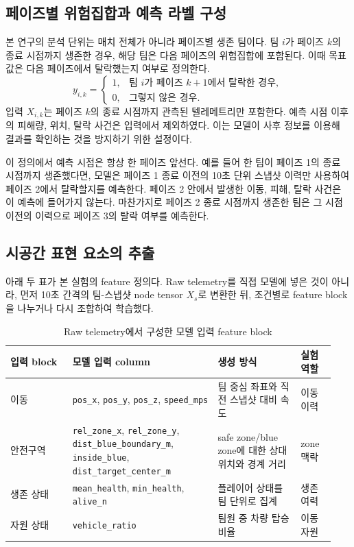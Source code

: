 \subsection{페이즈별 위험집합과 예측 라벨 구성}

본 연구의 분석 단위는 매치 전체가 아니라 페이즈별 생존 팀이다. 팀 \(i\)가
페이즈 \(k\)의 종료 시점까지 생존한 경우, 해당 팀은 다음 페이즈의 위험집합에
포함된다. 이때 목표값은 다음 페이즈에서 탈락했는지 여부로 정의한다.
\[
y_{i,k} =
\begin{cases}
1, & \text{팀 } i \text{가 페이즈 } k+1 \text{에서 탈락한 경우},\\
0, & \text{그렇지 않은 경우}.
\end{cases}
\]
입력 \(X_{i,k}\)는 페이즈 \(k\)의 종료 시점까지 관측된 텔레메트리만 포함한다.
예측 시점 이후의 피해량, 위치, 탈락 사건은 입력에서 제외하였다. 이는 모델이 사후
정보를 이용해 결과를 확인하는 것을 방지하기 위한 설정이다.

이 정의에서 예측 시점은 항상 한 페이즈 앞선다. 예를 들어 한 팀이 페이즈 1의
종료 시점까지 생존했다면, 모델은 페이즈 1 종료 이전의 10초 단위 스냅샷 이력만
사용하여 페이즈 2에서 탈락할지를 예측한다. 페이즈 2 안에서 발생한 이동, 피해,
탈락 사건은 이 예측에 들어가지 않는다. 마찬가지로 페이즈 2 종료 시점까지 생존한
팀은 그 시점 이전의 이력으로 페이즈 3의 탈락 여부를 예측한다.

\subsection{시공간 표현 요소의 추출}

아래 두 표가 본 실험의 feature 정의다. Raw telemetry를 직접 모델에 넣은 것이 아니라,
먼저 10초 간격의 팀-스냅샷 node tensor \(X_s\)로 변환한 뒤, 조건별로 feature block을
나누거나 다시 조합하여 학습했다.

\begin{table}[t]
\centering
\caption{Raw telemetry에서 구성한 모델 입력 feature block}
\label{tab:raw-feature-blocks}
\scriptsize
\setlength{\tabcolsep}{3pt}
\begin{tabular}{L{0.18\linewidth}L{0.42\linewidth}L{0.24\linewidth}L{0.10\linewidth}}
\toprule
입력 block & 모델 입력 column & 생성 방식 & 실험 역할 \\
\midrule
이동
& \texttt{pos\_x}, \texttt{pos\_y}, \texttt{pos\_z}, \texttt{speed\_mps}
& 팀 중심 좌표와 직전 스냅샷 대비 속도
& 이동 이력 \\
안전구역
& \texttt{rel\_zone\_x}, \texttt{rel\_zone\_y}, \texttt{dist\_blue\_boundary\_m}, \texttt{inside\_blue}, \texttt{dist\_target\_center\_m}
& safe zone/blue zone에 대한 상대 위치와 경계 거리
& zone 맥락 \\
생존 상태
& \texttt{mean\_health}, \texttt{min\_health}, \texttt{alive\_n}
& 플레이어 상태를 팀 단위로 집계
& 생존 여력 \\
자원 상태
& \texttt{vehicle\_ratio}
& 팀원 중 차량 탑승 비율
& 이동 자원 \\
\bottomrule
\end{tabular}
\end{table}

